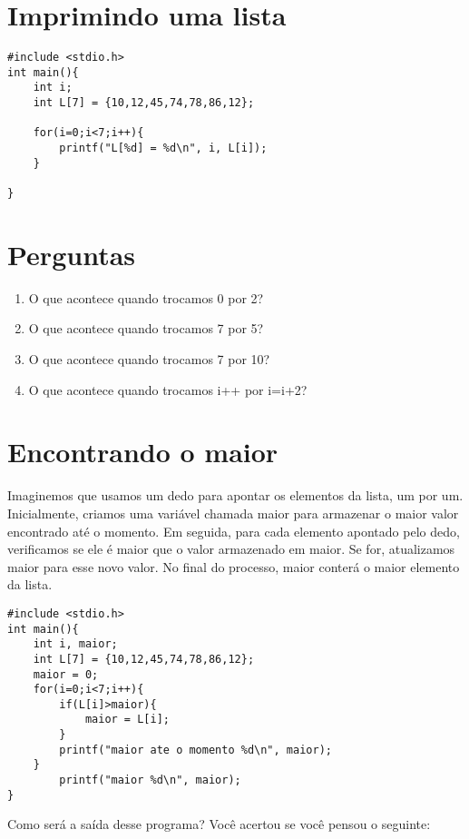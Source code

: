 \documentclass[a4paper,11pt]{article}
\begin{document}
\section*{Imprimindo uma lista}


\begin{verbatim}
#include <stdio.h>
int main(){
	int i;
	int L[7] = {10,12,45,74,78,86,12};
	
	for(i=0;i<7;i++){
		printf("L[%d] = %d\n", i, L[i]);
	}
	
}
\end{verbatim}

\section*{Perguntas}

\begin{enumerate}
\item O que acontece quando trocamos 0 por 2?
\item O que acontece quando trocamos 7 por 5?
\item O que acontece quando trocamos 7 por 10?
\item O que acontece quando trocamos i++ por i=i+2?
\end{enumerate}


\section*{Encontrando o maior}

Imaginemos que usamos um dedo para apontar os elementos da lista, um por um. Inicialmente, criamos uma variável chamada maior para armazenar o maior valor encontrado até o momento. Em seguida, para cada elemento apontado pelo dedo, verificamos se ele é maior que o valor armazenado em maior. Se for, atualizamos maior para esse novo valor. No final do processo, maior conterá o maior elemento da lista.


\begin{verbatim}
#include <stdio.h>
int main(){
	int i, maior;
	int L[7] = {10,12,45,74,78,86,12};	
	maior = 0;
	for(i=0;i<7;i++){
		if(L[i]>maior){
			maior = L[i];
		}
		printf("maior ate o momento %d\n", maior);
	}
        printf("maior %d\n", maior);
}
\end{verbatim}

Como será a saída desse programa? Você acertou se você pensou o seguinte:
\end{document}
